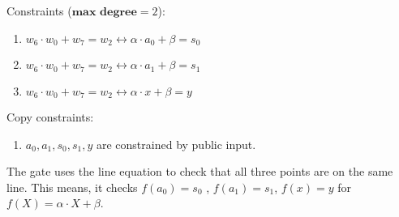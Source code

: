 Constraints ($\textbf{max degree} = 2$):
\begin{enumerate}
    \item $w_6 \cdot w_0 + w_7 = w_2 \longleftrightarrow 
            \alpha \cdot a_0 + \beta = s_0$
    \item $w_6 \cdot w_0 + w_7 = w_2 \longleftrightarrow 
            \alpha \cdot a_1 + \beta = s_1$
    \item $w_6 \cdot w_0 + w_7 = w_2 \longleftrightarrow 
            \alpha \cdot x + \beta = y$
\end{enumerate}

Copy constraints:
\begin{enumerate}
    \item $a_0, a_1, s_0, s_1, y$ are constrained by public input.
\end{enumerate}

The gate uses the line equation to check that all three points are on the same line.
This means, it checks $f(a_0) = s_0$ , $f(a_1) = s_1$, $f(x) = y$ for $f(X) = \alpha \cdot X + \beta$.